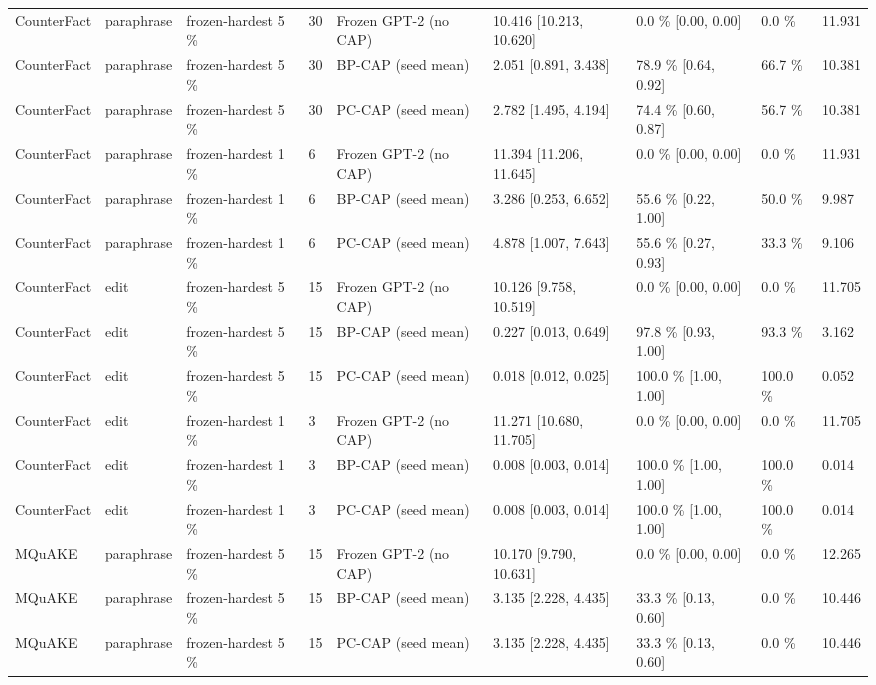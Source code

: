 \documentclass[10pt,a4paper]{article}
\begin{document}
\begin{center}
\begin{tabularx}{\textwidth}{@{}p{}XXXXXXXX@{}}
CounterFact & paraphrase & frozen-hardest 5 \% & 30 & Frozen GPT-2 (no CAP) & 10.416 [10.213, 10.620] & 0.0 \% [0.00, 0.00] & 0.0 \% & 11.931 \\
CounterFact & paraphrase & frozen-hardest 5 \% & 30 & BP-CAP (seed mean) & 2.051 [0.891, 3.438] & 78.9 \% [0.64, 0.92] & 66.7 \% & 10.381 \\
CounterFact & paraphrase & frozen-hardest 5 \% & 30 & PC-CAP (seed mean) & 2.782 [1.495, 4.194] & 74.4 \% [0.60, 0.87] & 56.7 \% & 10.381 \\
CounterFact & paraphrase & frozen-hardest 1 \% & 6 & Frozen GPT-2 (no CAP) & 11.394 [11.206, 11.645] & 0.0 \% [0.00, 0.00] & 0.0 \% & 11.931 \\
CounterFact & paraphrase & frozen-hardest 1 \% & 6 & BP-CAP (seed mean) & 3.286 [0.253, 6.652] & 55.6 \% [0.22, 1.00] & 50.0 \% & 9.987 \\
CounterFact & paraphrase & frozen-hardest 1 \% & 6 & PC-CAP (seed mean) & 4.878 [1.007, 7.643] & 55.6 \% [0.27, 0.93] & 33.3 \% & 9.106 \\
CounterFact & edit & frozen-hardest 5 \% & 15 & Frozen GPT-2 (no CAP) & 10.126 [9.758, 10.519] & 0.0 \% [0.00, 0.00] & 0.0 \% & 11.705 \\
CounterFact & edit & frozen-hardest 5 \% & 15 & BP-CAP (seed mean) & 0.227 [0.013, 0.649] & 97.8 \% [0.93, 1.00] & 93.3 \% & 3.162 \\
CounterFact & edit & frozen-hardest 5 \% & 15 & PC-CAP (seed mean) & 0.018 [0.012, 0.025] & 100.0 \% [1.00, 1.00] & 100.0 \% & 0.052 \\
CounterFact & edit & frozen-hardest 1 \% & 3 & Frozen GPT-2 (no CAP) & 11.271 [10.680, 11.705] & 0.0 \% [0.00, 0.00] & 0.0 \% & 11.705 \\
CounterFact & edit & frozen-hardest 1 \% & 3 & BP-CAP (seed mean) & 0.008 [0.003, 0.014] & 100.0 \% [1.00, 1.00] & 100.0 \% & 0.014 \\
CounterFact & edit & frozen-hardest 1 \% & 3 & PC-CAP (seed mean) & 0.008 [0.003, 0.014] & 100.0 \% [1.00, 1.00] & 100.0 \% & 0.014 \\
MQuAKE & paraphrase & frozen-hardest 5 \% & 15 & Frozen GPT-2 (no CAP) & 10.170 [9.790, 10.631] & 0.0 \% [0.00, 0.00] & 0.0 \% & 12.265 \\
MQuAKE & paraphrase & frozen-hardest 5 \% & 15 & BP-CAP (seed mean) & 3.135 [2.228, 4.435] & 33.3 \% [0.13, 0.60] & 0.0 \% & 10.446 \\
MQuAKE & paraphrase & frozen-hardest 5 \% & 15 & PC-CAP (seed mean) & 3.135 [2.228, 4.435] & 33.3 \% [0.13, 0.60] & 0.0 \% & 10.446 \\

\end{tabularx}
\end{center}
\end{document}
